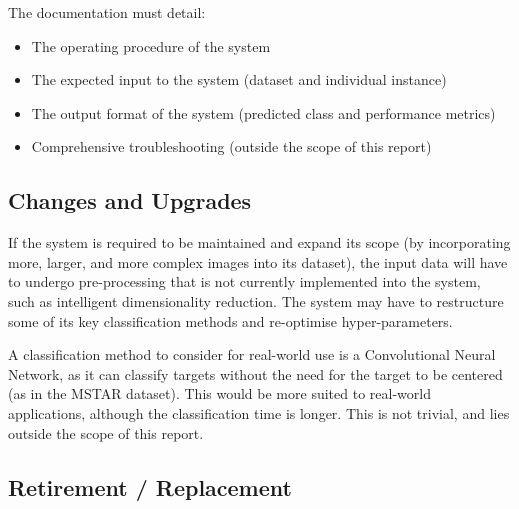 The documentation must detail:
\begin{itemize}
	\item The operating procedure of the system
	\item The expected input to the system (dataset and individual instance)
	\item The output format of the system (predicted class and performance metrics)
	\item Comprehensive troubleshooting (outside the scope of this report)
\end{itemize}



\subsection{Changes and Upgrades}

If the system is required to be maintained and expand its scope (by incorporating more, larger, and more complex images into its dataset), the input data will have to undergo pre-processing that is not currently implemented into the system, such as intelligent dimensionality reduction. The system may have to restructure some of its key classification methods and re-optimise hyper-parameters. 

A classification method to consider for real-world use is a Convolutional Neural Network, as it can classify targets without the need for the target to be centered (as in the MSTAR dataset). This would be more suited to real-world applications, although the classification time is longer. This is not trivial, and lies outside the scope of this report.

\subsection{Retirement / Replacement}












